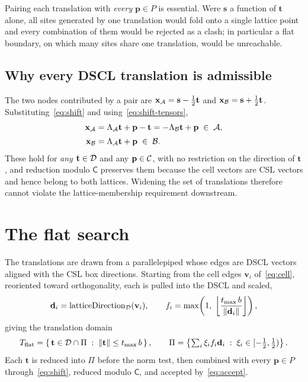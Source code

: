 Pairing each translation with \emph{every} $\mathbf{p} \in P$ is essential. Were
$\mathbf{s}$ a function of $\mathbf{t}$ alone, all sites generated by one
translation would fold onto a single lattice point and every combination of them
would be rejected as a clash; in particular a flat boundary, on which many sites
share one translation, would be unreachable.

\subsection*{Why every DSCL translation is admissible}

The two nodes contributed by a pair are $\mathbf{x}_{\mathcal{A}} = \mathbf{s} -
\tfrac12\mathbf{t}$ and $\mathbf{x}_{\mathcal{B}} = \mathbf{s} + \tfrac12\mathbf{t}$.
Substituting~\eqref{eq:shift} and using~\eqref{eq:shift-tensors},
\begin{align}
  \mathbf{x}_{\mathcal{A}}
    &= \Lambda_{\mathcal{A}}\mathbf{t} + \mathbf{p} - \mathbf{t}
     = -\Lambda_{\mathcal{B}}\mathbf{t} + \mathbf{p} \;\in\; \mathcal{A} ,
  \label{eq:xA}\\[2pt]
  \mathbf{x}_{\mathcal{B}}
    &= \Lambda_{\mathcal{A}}\mathbf{t} + \mathbf{p} \;\in\; \mathcal{B} .
  \label{eq:xB}
\end{align}
These hold for \emph{any} $\mathbf{t} \in \mathcal{D}$ and any $\mathbf{p} \in \mathcal{C}$, with
no restriction on the direction of $\mathbf{t}$, and reduction modulo
$\mathsf{C}$ preserves them because the cell vectors are CSL vectors and hence
belong to both lattices. Widening the set of translations therefore cannot
violate the lattice-membership requirement downstream.

\section*{The flat search}

The translations are drawn from a parallelepiped whose edges are DSCL vectors
aligned with the CSL box directions. Starting from the cell
edges $\mathbf{v}_i$ of~\eqref{eq:cell}, reoriented toward orthogonality, each is
pulled into the DSCL and scaled,
\begin{equation}
  \mathbf{d}_i = \operatorname{latticeDirection}_{\mathcal{D}}(\mathbf{v}_i),
  \qquad
  f_i = \max\!\left(1,\;
        \left\lfloor \frac{t_{\max}\, b}{\lVert \mathbf{d}_i \rVert} \right\rfloor
        \right),
  \label{eq:flat-edges}
\end{equation}
giving the translation domain
\begin{equation}
  T_{\text{flat}}
  = \left\{\, \mathbf{t} \in \mathcal{D} \cap \Pi \;:\;
      \lVert \mathbf{t} \rVert \le t_{\max}\, b \,\right\},
  \qquad
  \Pi = \left\{ \textstyle\sum_i \xi_i f_i \mathbf{d}_i
        \;:\; \xi_i \in [-\tfrac12, \tfrac12) \right\}.
  \label{eq:flat-domain}
\end{equation}
Each $\mathbf{t}$ is reduced into $\Pi$ before the norm test, then
combined with every $\mathbf{p} \in P$ through~\eqref{eq:shift}, reduced modulo
$\mathsf{C}$, and accepted by~\eqref{eq:accept}.

